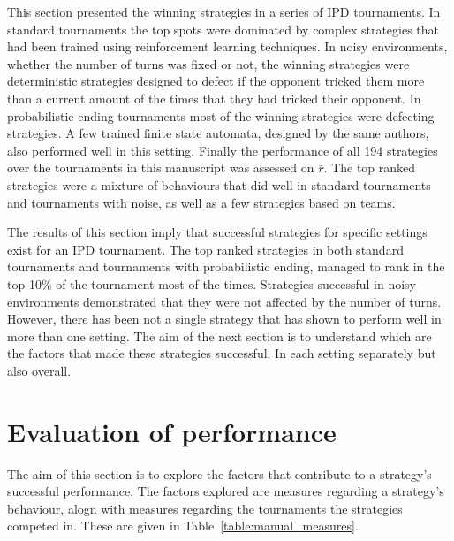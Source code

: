 \documentclass{article}
\newcommand{\numberofalltournaments}{}
\begin{document}
This section presented the winning strategies in a series of IPD tournaments. In
standard tournaments the top spots were dominated by complex strategies that had
been trained using reinforcement learning techniques. In noisy environments,
whether the number of turns was fixed or not, the winning strategies were
deterministic strategies designed to defect if the opponent tricked them more
than a current amount of the times that they had tricked their opponent. In
probabilistic ending tournaments most of the winning strategies were defecting
strategies. A few trained finite state automata, designed by the same authors,
also performed well in this setting. Finally the performance of all 194
strategies over the \numberofalltournaments tournaments in this manuscript was
assessed on \(\bar{r}\). The top ranked strategies were a mixture of behaviours
that did well in standard tournaments and tournaments with noise, as well as a
few strategies based on teams.

The results of this section imply that successful strategies for specific
settings exist for an IPD tournament. The top ranked strategies in both standard
tournaments and tournaments with probabilistic ending, managed to rank in the
top 10\% of the tournament most of the times. Strategies successful in noisy
environments demonstrated that they were not affected by the number of turns.
However, there has been not a single strategy that has shown to perform well in
more than one setting. The aim of the next section is to understand which are
the factors that made these strategies successful. In each setting separately
but also overall.

\section{Evaluation of performance}\label{section:evaluation_of_performance}

The aim of this section is to explore the factors that contribute to a
strategy's successful performance. The factors explored are measures regarding a
strategy's behaviour, alogn with measures regarding the tournaments the
strategies competed in. These are given in Table~\ref{table:manual_measures}.
\end{document}
